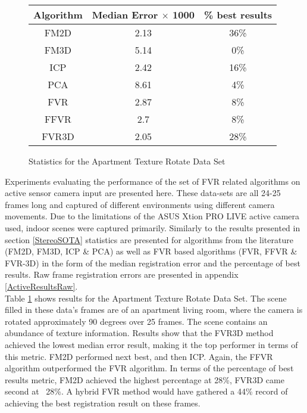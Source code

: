 

\begin{figure}
\centering
\begin{tabular}{ccc}
\hline
\textbf{Algorithm} & \textbf{Median Error $\times$ 1000} & \textbf{\% best results}\\ \hline
FM2D	& 2.13 & 36\%\\
FM3D	& 5.14 & 0\%\\
ICP	& 2.42 & 16\%\\
PCA	& 8.61 & 4\%\\
FVR	& 2.87 & 8\%\\
FFVR	& 2.7 & 8\%\\
FVR3D	& 2.05 & 28\%\\
\end{tabular}
\caption{Statistics for the Apartment Texture Rotate Data Set}
\label{tab:apartmenttexturerotate}
\end{figure} 


Experiments evaluating the performance of the set of FVR related algorithms on active sensor camera input are presented here. These data-sets are all 24-25 frames long and captured of different environments using different camera movements. Due to the limitations of the ASUS Xtion PRO LIVE active camera used, indoor scenes were captured primarily. Similarly to the results presented in section \ref{StereoSOTA} statistics are presented for algorithms from the literature (FM2D, FM3D, ICP \& PCA) as well as FVR based algorithms (FVR, FFVR \& FVR-3D) in the form of the median registration error and the percentage of best results. Raw frame registration errors are presented in appendix \ref{ActiveResultsRaw}. \\

Table \ref{tab:apartmenttexturerotate} shows results for the Apartment Texture Rotate Data Set. The scene filled in these data's frames are of an apartment living room, where the camera is rotated approximately 90 degrees over 25 frames. The scene contains an abundance of texture information. Results show that the FVR3D method achieved the lowest median error result, making it the top performer in terms of this metric. FM2D performed next best, and then ICP. Again, the FFVR algorithm outperformed the FVR algorithm. In terms of the percentage of best results metric, FM2D achieved the highest percentage at 28\%, FVR3D came second at ~28\%. A hybrid FVR method would have gathered a 44\% record of achieving the best registration result on these frames. \\



